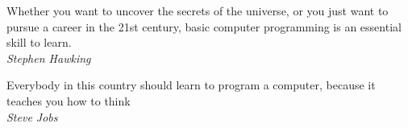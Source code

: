 \documentclass[
    corpo=11pt,
    twoside,
]{toptesi}
\begin{document}

\begin{flushright}
  \noindent
  Whether you want to uncover the secrets of the universe, or you just want to pursue a career in the 21st century, basic computer programming is an essential skill to learn.\\
  \vspace{5px}
  \small{\textit{Stephen Hawking}}
\end{flushright}
\begin{flushright}
  \noindent
  Everybody in this country should learn to program a computer, because it teaches you how to think\\
  \vspace{5px}
  \small{\textit{Steve Jobs}}
\end{flushright}
\cleardoublepage


\ringraziamenti

\end{document}
